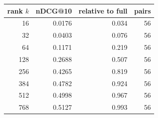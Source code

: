 \begin{tabular}{rrrr}
\toprule
rank $k$ & nDCG@10 & relative to full & pairs \\
\midrule
16 & 0.0176 & 0.034 & 56 \\
32 & 0.0403 & 0.076 & 56 \\
64 & 0.1171 & 0.219 & 56 \\
128 & 0.2688 & 0.507 & 56 \\
256 & 0.4265 & 0.819 & 56 \\
384 & 0.4782 & 0.924 & 56 \\
512 & 0.4998 & 0.967 & 56 \\
768 & 0.5127 & 0.993 & 56 \\
\bottomrule
\end{tabular}